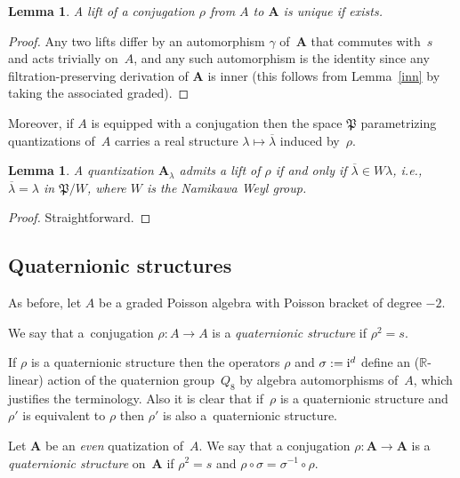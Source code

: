 \documentclass[pdftex]{sigma}
\numberwithin{equation}{section}
\newtheorem{Lemma}[Theorem]{Lemma}
\begin{document}
\begin{Lemma}\label{lh3} A lift of a conjugation $\rho$ from $A$ to ${\mathbf A}$ is unique if exists.
\end{Lemma}

\begin{proof} Any two lifts differ by an automorphism $\gamma$ of~${\mathbf A}$ that commutes with~$s$ and acts trivially on~$A$, and any such automorphism is the identity since any filtration-preserving derivation of ${\mathbf A}$ is inner (this follows from Lemma~\ref{inn} by taking the associated graded).
\end{proof}

Moreover, if $A$ is equipped with a conjugation then the space $\mathfrak{P}$ parametrizing quantizations of~$A$ carries a real structure $\lambda\mapsto \overline{\lambda}$ induced by~$\rho$.

\begin{Lemma}\label{lh4} A quantization ${\mathbf A}_\lambda$ admits a lift of $\rho$ if and only if $\overline{\lambda}\in W\lambda$, i.e., $\overline{\lambda}=\lambda$ in $\mathfrak{P}/W$, where $W$ is the Namikawa Weyl group.
\end{Lemma}

\begin{proof} Straightforward.
\end{proof}

\subsection{Quaternionic structures}

As before, let $A$ be a graded Poisson algebra with Poisson bracket of degree $-2$.

\begin{Definition} We say that a~conjugation $\rho\colon A\to A$ is a {\it quaternionic structure}
if $\rho^2=s$.
\end{Definition}

If $\rho$ is a quaternionic structure then the operators $\rho$ and $\sigma:={\rm i}^d$ define an (${\mathbb R}$-linear) action of the quaternion group~$Q_8$ by algebra automorphisms of~$A$, which justifies the terminology. Also it is clear that if~$\rho$ is a quaternionic structure and $\rho'$ is equivalent to $\rho$ then $\rho'$ is also a~quaternionic structure.

\begin{Definition} Let ${\mathbf A}$ be an {\it even} quatization of~$A$. We say that a conjugation $\rho\colon {\mathbf A}\to {\mathbf A}$ is a {\it quaternionic structure} on~${\mathbf A}$ if $\rho^2=s$ and $\rho \circ \sigma=\sigma^{-1}\circ \rho$.
\end{Definition}
\end{document}
